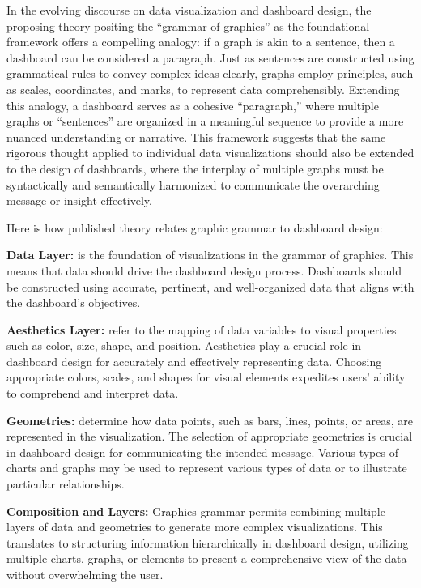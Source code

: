 \documentclass[print]{nuthesis}
\begin{document}
In the evolving discourse on data visualization and dashboard design, the proposing theory positing the ``grammar of graphics'' as the foundational framework offers a compelling analogy: if a graph is akin to a sentence, then a dashboard can be considered a paragraph.
Just as sentences are constructed using grammatical rules to convey complex ideas clearly, graphs employ principles, such as scales, coordinates, and marks, to represent data comprehensibly.
Extending this analogy, a dashboard serves as a cohesive ``paragraph,'' where multiple graphs or ``sentences'' are organized in a meaningful sequence to provide a more nuanced understanding or narrative.
This framework suggests that the same rigorous thought applied to individual data visualizations should also be extended to the design of dashboards, where the interplay of multiple graphs must be syntactically and semantically harmonized to communicate the overarching message or insight effectively.

Here is how published theory relates graphic grammar to dashboard design:

\textbf{Data Layer:} is the foundation of visualizations in the grammar of graphics.
This means that data should drive the dashboard design process.
Dashboards should be constructed using accurate, pertinent, and well-organized data that aligns with the dashboard's objectives.

\textbf{Aesthetics Layer:} refer to the mapping of data variables to visual properties such as color, size, shape, and position.
Aesthetics play a crucial role in dashboard design for accurately and effectively representing data.
Choosing appropriate colors, scales, and shapes for visual elements expedites users' ability to comprehend and interpret data.

\textbf{Geometries:} determine how data points, such as bars, lines, points, or areas, are represented in the visualization.
The selection of appropriate geometries is crucial in dashboard design for communicating the intended message.
Various types of charts and graphs may be used to represent various types of data or to illustrate particular relationships.

\textbf{Composition and Layers:} Graphics grammar permits combining multiple layers of data and geometries to generate more complex visualizations.
This translates to structuring information hierarchically in dashboard design, utilizing multiple charts, graphs, or elements to present a comprehensive view of the data without overwhelming the user.
\end{document}
